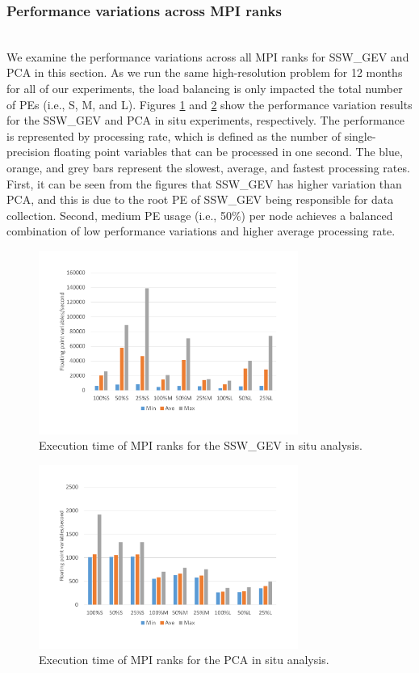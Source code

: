 \documentclass{juliacon}
\begin{document}
\subsubsection{Performance variations across MPI ranks}\hspace*{\fill} \\

We examine the performance variations across all MPI ranks for SSW\_GEV and PCA in this section. As we run the same high-resolution problem for 12 months for all of our experiments, the load balancing is only impacted the total number of PEs (i.e., S, M, and L). Figures \ref{fig:ssw_outliers} and \ref{fig:pca_outliers} show the performance variation results for the SSW\_GEV and PCA in situ experiments, respectively. The performance is represented by processing rate, which is defined as the number of single-precision floating point variables that can be processed in one second. The blue, orange, and grey bars represent the slowest, average, and fastest processing rates. First, it can be seen from the figures that SSW\_GEV has higher variation than PCA, and this is due to the root PE of SSW\_GEV being responsible for data collection. Second, medium PE usage (i.e., 50\%) per node achieves a balanced combination of low performance variations and higher average processing rate. 

\begin{figure}
    \centering
    \includegraphics[width=\linewidth, height=6cm]{figures/ssw_outliers.pdf}
    \caption{Execution time of MPI ranks for the SSW\_GEV in situ analysis.}
    \label{fig:ssw_outliers}
\end{figure}


\begin{figure}
    \centering
    \includegraphics[width=\linewidth, height=6cm]{figures/pca_outliers.pdf}
    \caption{Execution time of MPI ranks for the PCA in situ analysis.}
    \label{fig:pca_outliers}
\end{figure}
\end{document}
